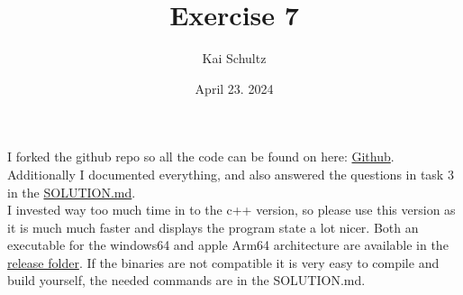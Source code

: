 \documentclass[11pt]{article}
\title{Exercise 7}
\author{Kai Schultz}
\date{April 23. 2024} %
\begin{document}
\maketitle
I forked the github repo so all the code can be found on here: \href{https://github.com/KaiTries/exercise-7}{Github}.
Additionally I documented everything, and also answered the questions in task 3 in the  \href{https://github.com/KaiTries/exercise-7/blob/main/SOLUTION.md}{SOLUTION.md}.\\
I invested way too much time in to the c++ version, so please use this version as it is much much faster and displays the program state a lot nicer. Both an executable for the windows64 and apple Arm64 architecture are available in the \href{https://github.com/KaiTries/exercise-7/tree/main/release}{release folder}. If the binaries are not compatible it is very easy to compile and build yourself, the needed commands are in the SOLUTION.md. 
\end{document}
